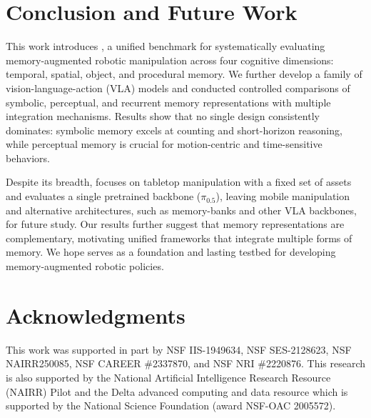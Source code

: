 \section{Conclusion and Future Work}
\label{sec:conclusion}

This work introduces \benchname, a unified benchmark for systematically evaluating memory-augmented robotic manipulation across four cognitive dimensions: temporal, spatial, object, and procedural memory. We further develop a family of vision-language-action (VLA) models and conducted controlled comparisons of symbolic, perceptual, and recurrent memory representations with multiple integration mechanisms. Results show that no single design consistently dominates: symbolic memory excels at counting and short-horizon reasoning, while perceptual memory is crucial for motion-centric and time-sensitive behaviors.


Despite its breadth, \benchname\xspace focuses on tabletop manipulation with a fixed set of assets and evaluates a single pretrained backbone ($\pi_{0.5}$), leaving mobile manipulation and alternative architectures, such as memory-banks and other VLA backbones, for future study. 
Our results further suggest that memory representations are complementary, motivating unified frameworks that integrate multiple forms of memory. We hope \benchname\xspace serves as a foundation and lasting testbed for developing memory-augmented robotic policies.

\section*{Acknowledgments}
This work was supported in part by NSF IIS-1949634, NSF SES-2128623, NSF NAIRR250085, NSF CAREER \#2337870, and NSF NRI \#2220876. This research is also supported by the National Artificial Intelligence Research Resource (NAIRR) Pilot and the Delta advanced computing and data resource which is supported by the National Science Foundation (award NSF-OAC 2005572).
